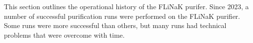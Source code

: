 %
%

\label{chap: operational history}

This section outlines the operational history of the FLiNaK purifer. Since
2023, a number of successful purification runs were performed on the FLiNaK
purifier. Some runs were more successful than others, but many runs had 
technical problems that were overcome with time. \par
